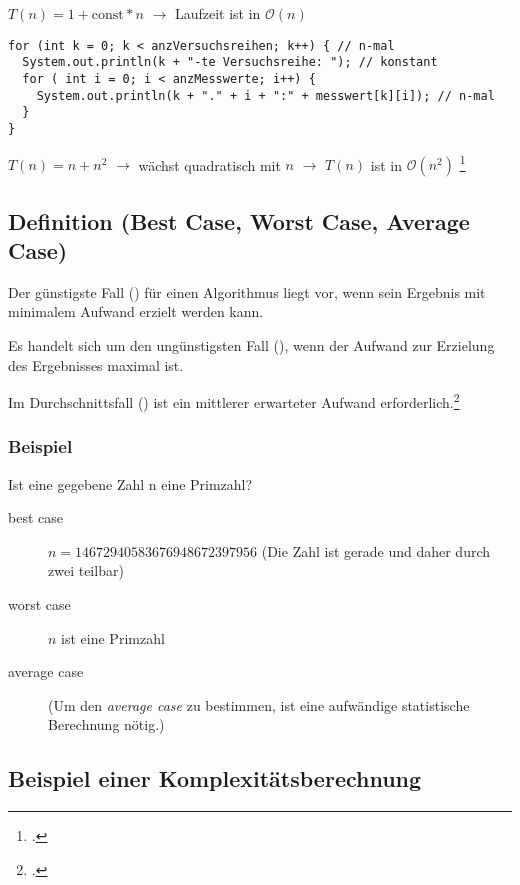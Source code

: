 \documentclass{lehramt-informatik-haupt}
\begin{document}
\noindent
$T(n) = 1 + \text{const} * n$
$\rightarrow$ Laufzeit ist in $\mathcal{O}(n)$

\begin{verbatim}
for (int k = 0; k < anzVersuchsreihen; k++) { // n-mal
  System.out.println(k + "-te Versuchsreihe: "); // konstant
  for ( int i = 0; i < anzMesswerte; i++) {
    System.out.println(k + "." + i + ":" + messwert[k][i]); // n-mal
  }
}
\end{verbatim}

\noindent
$T(n)= n + n^2$
$\rightarrow$ wächst quadratisch mit $n$
$\rightarrow$ $T(n)$ ist in $\mathcal{O}(n^2)$
\footcite[Seite 25 (PDF 17)]{aud:fs:2}

%

\subsection{Definition (Best Case, Worst Case, Average Case)}

Der günstigste Fall () für einen Algorithmus liegt vor,
wenn sein Ergebnis mit minimalem Aufwand erzielt werden kann.

Es handelt sich um den ungünstigsten Fall (), wenn der
Aufwand zur Erzielung des Ergebnisses maximal ist.

Im Durchschnittsfall () ist ein mittlerer erwarteter
Aufwand erforderlich.\footcite[Seite 26 (PDF 18)]{aud:fs:2}

\subsubsection{Beispiel}

Ist eine gegebene Zahl n eine Primzahl?

\begin{description}
\item[best case] $n = 14672940583676948672397956$
(Die Zahl ist gerade und daher durch zwei teilbar)

\item[worst case] $n$ ist eine Primzahl

\item[average case] (Um den \emph{average case} zu bestimmen, ist eine
aufwändige statistische Berechnung nötig.)
\end{description}

%

\subsection{Beispiel einer Komplexitätsberechnung}
\end{document}
